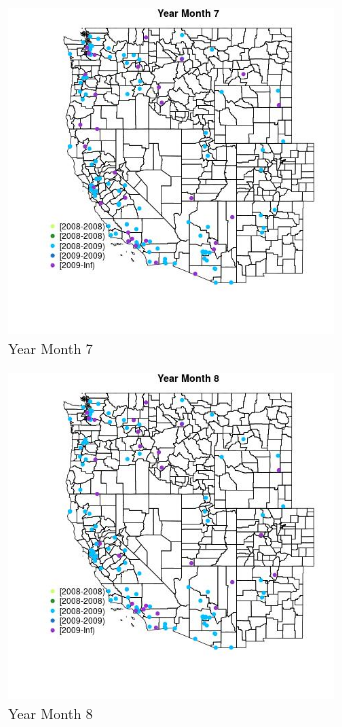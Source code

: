 \begin{figure} 
\centering  
\includegraphics[width=0.77\textwidth]{Code_Outputs/Report_ML_input_PM25_Step4_part_e_de_duplicated_aves_MapObsMo7Year.jpg} 
\caption{\label{fig:Report_ML_input_PM25_Step4_part_e_de_duplicated_avesMapObsMo7Year}Year Month 7} 
\end{figure} 
 

\begin{figure} 
\centering  
\includegraphics[width=0.77\textwidth]{Code_Outputs/Report_ML_input_PM25_Step4_part_e_de_duplicated_aves_MapObsMo8Year.jpg} 
\caption{\label{fig:Report_ML_input_PM25_Step4_part_e_de_duplicated_avesMapObsMo8Year}Year Month 8} 
\end{figure} 
 

